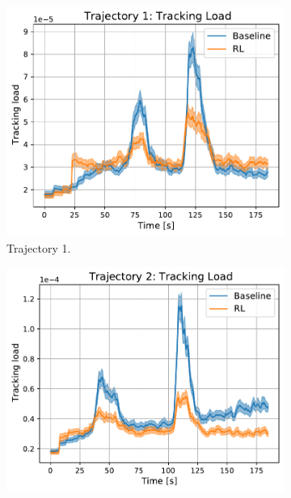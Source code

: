 \documentclass[english, 12pt, a4paper, elec, utf8, a-1b, online]{aaltothesis}
\numberwithin{equation}{section}
\begin{document}
\begin{figure}
    \centering
    \begin{subfigure}[b]{0.45\textwidth}
        \centering
        \includegraphics[width=\linewidth]{figures/benchmark/Simulations/tracking_load_0.pdf}
        \caption{Trajectory 1.}
        \label{fig:TL_T1}
    \end{subfigure}
    \hfill
    \begin{subfigure}[b]{0.45\textwidth}
        \centering
        \includegraphics[width=\linewidth]{figures/benchmark/Simulations/tracking_load_1.pdf}

\end{subfigure}
\end{figure}
\end{document}
